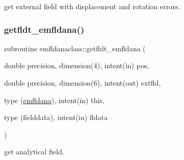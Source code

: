 get external field with displacement and rotation errors. 

\mbox{\label{namespaceemfldanaclass_a7ecbabd3d9e65aadaf2e8ccb096c6eed}} 
\subsubsection{\texorpdfstring{getfldt\_emfldana()}{getfldt\_emfldana()}}
{\footnotesize\ttfamily subroutine emfldanaclass\+::getfldt\+\_\+emfldana (\begin{DoxyParamCaption}\item[{double precision, dimension(4), intent(in)}]{pos,  }\item[{double precision, dimension(6), intent(out)}]{extfld,  }\item[{type (\mbox{\hyperlink{namespaceemfldanaclass_structemfldanaclass_1_1emfldana}{emfldana}}), intent(in)}]{this,  }\item[{type (fielddata), intent(in)}]{fldata }\end{DoxyParamCaption})}



get analytical field. 

